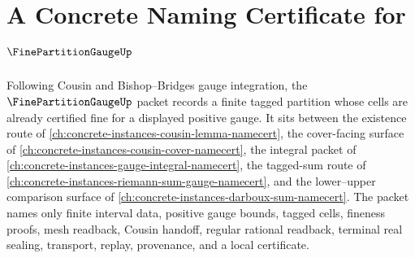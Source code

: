 \chapter{A Concrete Naming Certificate for $\FinePartitionGaugeUp$}
\label{ch:concrete-instances-fine-partition-gauge-namecert}

Following Cousin and Bishop--Bridges gauge integration, the $\FinePartitionGaugeUp$ packet records a finite tagged partition whose cells are already certified fine for a displayed positive gauge. It sits between the existence route of \autoref{ch:concrete-instances-cousin-lemma-namecert}, the cover-facing surface of \autoref{ch:concrete-instances-cousin-cover-namecert}, the integral packet of \autoref{ch:concrete-instances-gauge-integral-namecert}, the tagged-sum route of \autoref{ch:concrete-instances-riemann-sum-gauge-namecert}, and the lower--upper comparison surface of \autoref{ch:concrete-instances-darboux-sum-namecert}. The packet names only finite interval data, positive gauge bounds, tagged cells, fineness proofs, mesh readback, Cousin handoff, regular rational readback, terminal real sealing, transport, replay, provenance, and a local certificate.

